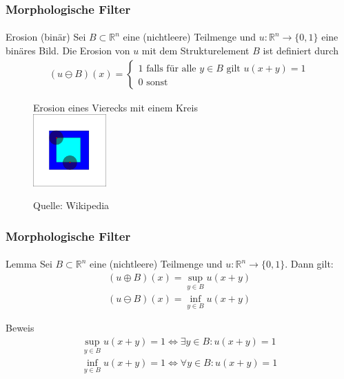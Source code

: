 \documentclass{beamer}
\begin{document}
\begin{frame}
    \frametitle{Morphologische Filter}
\framesubtitle{}

\begin{block}{Erosion (binär)}
Sei $B \subset \mathbb{R}^n$ eine (nichtleere) Teilmenge und $u : \mathbb{R}^n \to \{ 0,1 \}$  eine binäres Bild.  Die Erosion von $u$ mit dem Strukturelement $B$ ist definiert durch
\begin{align*}
(u \ominus B)(x) = \begin{cases} 1 \text{ falls für alle $y \in B$ gilt } u(x + y) = 1 \\ 0 \text{ sonst} \end{cases}
\end{align*}
\end{block}
\begin{figure}[htp]
      \centering
Erosion eines Vierecks mit einem Kreis \\
    \includegraphics[width=0.25\textwidth]{img/Erosion} 
      \caption{Quelle: Wikipedia}
\end{figure}

 \end{frame}


\begin{frame}
    \frametitle{Morphologische Filter}
\framesubtitle{}

\begin{block}{Lemma}
Sei $B \subset \mathbb{R}^n$ eine (nichtleere) Teilmenge und $u : \mathbb{R}^n \to \{ 0,1 \}$. Dann gilt:
\begin{align*}
(u \oplus B)(x) = \sup_{y \in B} u(x +y) \\
(u \ominus B)(x) = \inf_{y \in B} u(x +y)
\end{align*}
\end{block}
\begin{block}{Beweis}
\begin{align*}
 \sup_{y \in B} u(x +y) = 1 \Leftrightarrow \exists y \in B: u(x +y) = 1  \\
\inf_{y \in B} u(x +y) = 1  \Leftrightarrow \forall y \in B: u(x +y) = 1  \\
\end{align*}
\end{block}

 \end{frame}
\end{document}
